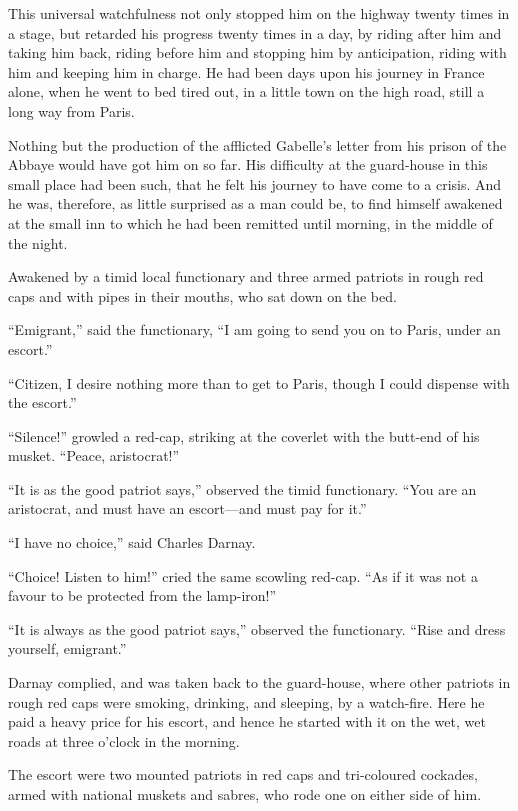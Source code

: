 This universal watchfulness not only stopped him on the highway
twenty times in a stage, but retarded his progress twenty times in a
day, by riding after him and taking him back, riding before him and
stopping him by anticipation, riding with him and keeping him in
charge.  He had been days upon his journey in France alone, when he
went to bed tired out, in a little town on the high road, still a
long way from Paris.

Nothing but the production of the afflicted Gabelle's letter from his
prison of the Abbaye would have got him on so far.  His difficulty at
the guard-house in this small place had been such, that he felt his
journey to have come to a crisis.  And he was, therefore, as little
surprised as a man could be, to find himself awakened at the small
inn to which he had been remitted until morning, in the middle of the
night.

Awakened by a timid local functionary and three armed patriots in
rough red caps and with pipes in their mouths, who sat down on the bed.

``Emigrant,'' said the functionary, ``I am going to send you on to Paris,
under an escort.''

``Citizen, I desire nothing more than to get to Paris, though I could
dispense with the escort.''

``Silence!'' growled a red-cap, striking at the coverlet with the
butt-end of his musket.  ``Peace, aristocrat!''

``It is as the good patriot says,'' observed the timid functionary.
``You are an aristocrat, and must have an escort---and must pay for it.''

``I have no choice,'' said Charles Darnay.

``Choice!  Listen to him!'' cried the same scowling red-cap.  ``As if it
was not a favour to be protected from the lamp-iron!''

``It is always as the good patriot says,'' observed the functionary.
``Rise and dress yourself, emigrant.''

Darnay complied, and was taken back to the guard-house, where other
patriots in rough red caps were smoking, drinking, and sleeping, by a
watch-fire.  Here he paid a heavy price for his escort, and hence he
started with it on the wet, wet roads at three o'clock in the morning.

The escort were two mounted patriots in red caps and tri-coloured
cockades, armed with national muskets and sabres, who rode one on
either side of him.

